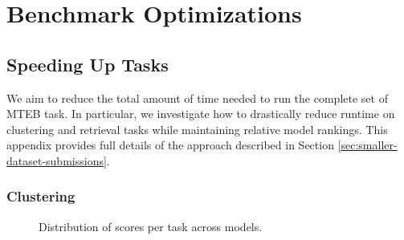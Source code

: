 
\section{Benchmark Optimizations}
\subsection{Speeding Up Tasks}
\label{sec:speedup}
We aim to reduce the total amount of time needed to run the complete set of MTEB task. In particular, we investigate how to drastically reduce runtime on clustering and retrieval tasks while maintaining relative model rankings. This appendix provides full details of the approach described in Section \ref{sec:smaller-dataset-submissions}.

\subsubsection{Clustering}

\begin{figure*}
    \centering
    \hfill
    \hfill
    \par
    \hfill
    \hfill
    \par
    \hfill
    \hfill
    \caption{Distribution of scores per task across models.}
    \label{fig:clusterfast-v-measures}
\end{figure*}


